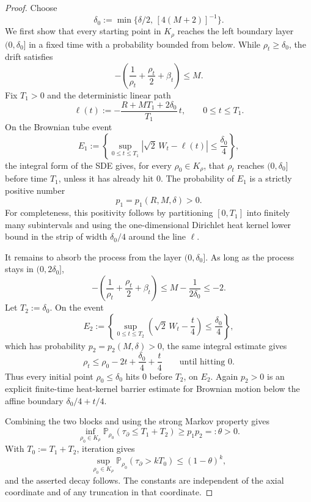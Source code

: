 \documentclass[11pt]{amsart}
\numberwithin{equation}{section}
\theoremstyle{plain}
\theoremstyle{definition}
\theoremstyle{remark}
\begin{document}
\begin{proof}
Choose
\[
   \delta_0:=\min\{\delta/2,\,[4(M+2)]^{-1}\}.
\]
We first show that every starting point in \(K_\rho\) reaches the left boundary
layer \((0,\delta_0]\) in a fixed time with a probability bounded from below.
While \(\rho_t\ge\delta_0\), the drift satisfies
\[
   -\left(\frac1{\rho_t}+\frac{\rho_t}{2}+\beta_t\right)\le M .
\]
Fix \(T_1>0\) and the deterministic linear path
\[
   \ell(t):=-\frac{R+MT_1+2\delta_0}{T_1}\,t,\qquad 0\le t\le T_1 .
\]
On the Brownian tube event
\[
   E_1:=
   \left\{\sup_{0\le t\le T_1}
      \left|\sqrt2\,W_t-\ell(t)\right|\le\frac{\delta_0}{4}\right\},
\]
the integral form of the SDE gives, for every \(\rho_0\in K_\rho\), that
\(\rho_t\) reaches \((0,\delta_0]\) before time \(T_1\), unless it has already
hit \(0\).  The probability of \(E_1\) is a strictly positive number
\[
   p_1=p_1(R,M,\delta)>0 .
\]
For completeness, this positivity follows by partitioning \([0,T_1]\) into
finitely many subintervals and using the one-dimensional Dirichlet heat kernel
lower bound in the strip of width \(\delta_0/4\) around the line \(\ell\).

It remains to absorb the process from the layer \((0,\delta_0]\).  As long as
the process stays in \((0,2\delta_0]\),
\[
   -\left(\frac1{\rho_t}+\frac{\rho_t}{2}+\beta_t\right)
   \le M-\frac1{2\delta_0}\le -2 .
\]
Let \(T_2:=\delta_0\).  On the event
\[
   E_2:=
   \left\{\sup_{0\le t\le T_2}
      \left(\sqrt2\,W_t-\frac t4\right)\le\frac{\delta_0}{4}\right\},
\]
which has probability \(p_2=p_2(M,\delta)>0\), the same integral estimate gives
\[
   \rho_t\le \rho_0-2t+\frac{\delta_0}{4}+\frac t4
   \qquad\text{until hitting }0 .
\]
Thus every initial point \(\rho_0\le\delta_0\) hits \(0\) before
\(T_2\), on \(E_2\).  Again \(p_2>0\) is an explicit finite-time heat-kernel
barrier estimate for Brownian motion below the affine boundary
\(\delta_0/4+t/4\).

Combining the two blocks and using the strong Markov property gives
\[
   \inf_{\rho_0\in K_\rho}
   \mathbb P_{\rho_0}(\tau_\partial\le T_1+T_2)
   \ge p_1p_2=:\theta>0 .
\]
With \(T_0:=T_1+T_2\), iteration gives
\[
   \sup_{\rho_0\in K_\rho}
   \mathbb P_{\rho_0}(\tau_\partial>kT_0)
   \le (1-\theta)^k ,
\]
and the asserted decay follows.  The constants are independent of the axial
coordinate and of any truncation in that coordinate.
\end{proof}
\end{document}
